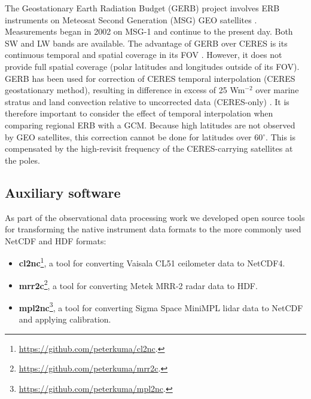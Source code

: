 The Geostationary Earth Radiation Budget (GERB) project involves ERB instruments
on Meteosat Second Generation (MSG) GEO satellites \citep{harries2005}.
Measurements began in 2002 on MSG-1 and continue to the present day.
Both SW and LW bands are available. The advantage of GERB
over CERES is its continuous temporal and spatial coverage in its FOV
\citep{sandford2003}. However, it does not provide full spatial coverage
(polar latitudes and longitudes outside of its FOV).
GERB has been used for correction of CERES temporal interpolation
(CERES geostationary method), resulting in difference in excess of 25 Wm$^{-2}$
over marine stratus and land convection relative to uncorrected data
(CERES-only) \citep{doelling2013}. It is therefore important to consider
the effect of temporal interpolation when comparing regional ERB with a GCM.
Because high latitudes are not observed by GEO satellites, this correction
cannot be done for latitudes over 60$^{\circ}$. This is compensated by the high-revisit
frequency of the CERES-carrying satellites at the poles.


\subsection{Auxiliary software}

As part of the observational data processing work we developed
open source tools for transforming the native instrument data formats to
the more commonly used NetCDF and HDF formats:

\begin{itemize}
\item \textbf{cl2nc}\footnote{\url{https://github.com/peterkuma/cl2nc}.}, a tool for converting Vaisala CL51
ceilometer data to NetCDF4.
\item \textbf{mrr2c}\footnote{\url{https://github.com/peterkuma/mrr2c}.}, a tool for converting
Metek MRR-2 radar data to HDF.
\item \textbf{mpl2nc}\footnote{\url{https://github.com/peterkuma/mpl2nc}.}, a tool for converting Sigma Space MiniMPL lidar data to NetCDF and applying calibration.
\end{itemize}

